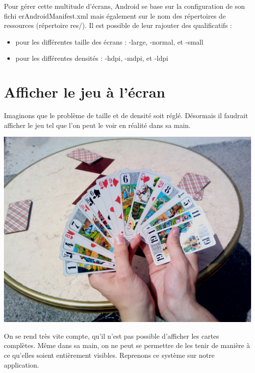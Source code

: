\documentclass[a4paper]{report}
\begin{document}
		Pour gérer cette multitude d'écrans, Android se base sur la configuration de son fichi erAndroidManifest.xml mais également sur le nom des répertoires de ressources (répertoire res/). 		Il est possible de leur rajouter des qualificatifs :\\
		\begin{itemize}
   			\item pour les différentes taille des écrans : -large, -normal, et -small

   		 	\item pour les différentes densités : -hdpi, -mdpi, et -ldpi

		\end{itemize}

	\section{Afficher le jeu à l’écran}


		Imaginons que le problème de taille et de densité soit réglé. Désormais il faudrait afficher le jeu tel que l’on peut le voir en réalité dans sa main.
		\begin{center}
			\includegraphics[scale=0.15]{Images/1.jpg}
		\end{center}

		On se rend très vite compte, qu’il n’est pas possible d’afficher les cartes complètes. Même dans sa main, on ne peut se permettre de les tenir de manière à ce qu’elles soient 			entièrement visibles. Reprenons ce système sur notre application. 
\end{document}
